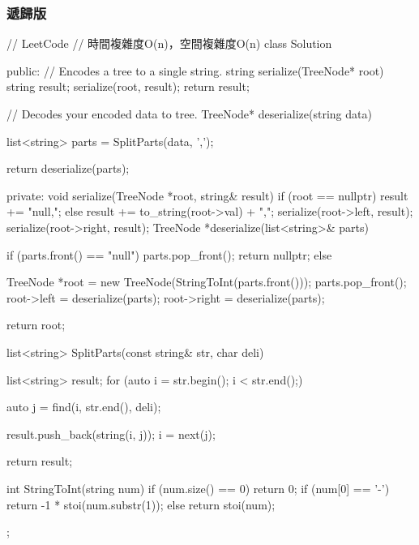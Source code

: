\subsubsection{遞歸版}
\begin{Code}
// LeetCode
// 時間複雜度O(n)，空間複雜度O(n)
class Solution {
public:
    // Encodes a tree to a single string.
    string serialize(TreeNode* root) {
        string result;
        serialize(root, result);
        return result;
    }

    // Decodes your encoded data to tree.
    TreeNode* deserialize(string data) {
        list<string> parts = SplitParts(data, ',');

        return deserialize(parts);
    }
private:
    void serialize(TreeNode *root, string& result) {
        if (root == nullptr)
            result += "null,";
        else {
            result += to_string(root->val) + ",";
            serialize(root->left, result);
            serialize(root->right, result);
        }
    }
    TreeNode *deserialize(list<string>& parts) {
        if (parts.front() == "null") {
            parts.pop_front();
            return nullptr;
        }
        else {
            TreeNode *root = new TreeNode(StringToInt(parts.front()));
            parts.pop_front();
            root->left = deserialize(parts);
            root->right = deserialize(parts);

            return root;
        }
    }
    list<string> SplitParts(const string& str, char deli) {
        list<string> result;
        for (auto i = str.begin(); i < str.end();) {
            auto j = find(i, str.end(), deli);

            result.push_back(string(i, j));
            i = next(j);
        }
        return result;
    }
    int StringToInt(string num) {
        if (num.size() == 0) return 0;
        if (num[0] == '-')
            return -1 * stoi(num.substr(1));
        else
            return stoi(num);
    }
};
\end{Code}

